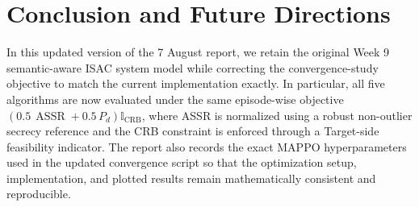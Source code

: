 \documentclass[journal,onecolumn]{IEEEtran}
\begin{document}
\section{Conclusion and Future Directions}
In this updated version of the 7 August report, we retain the original Week 9 semantic-aware ISAC system model while correcting the convergence-study objective to match the current implementation exactly. In particular, all five algorithms are now evaluated under the same episode-wise objective $\left(0.5\,\operatorname{ASSR} + 0.5\,P_d\right)\mathbb{I}_{\text{CRB}}$, where ASSR is normalized using a robust non-outlier secrecy reference and the CRB constraint is enforced through a Target-side feasibility indicator. The report also records the exact MAPPO hyperparameters used in the updated convergence script so that the optimization setup, implementation, and plotted results remain mathematically consistent and reproducible.


\end{document}

